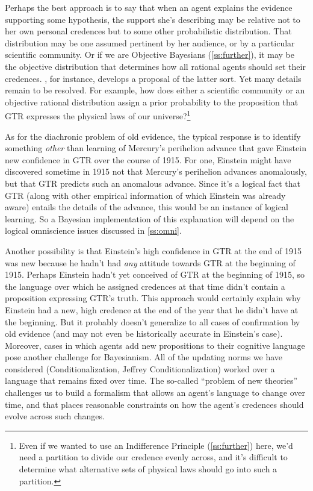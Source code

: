 Perhaps the best approach is to say that when an agent explains the evidence supporting some hypothesis, the support she's describing may be relative not to her own personal credences but to some other probabilistic distribution. That distribution may be one assumed pertinent by her audience, or by a particular scientific community. Or if we are Objective Bayesians (\autoref{ss:further}), it may be the objective distribution that determines how all rational agents should set their credences. \citet{MaherSubjectiveObjective}, for instance, develops a proposal of the latter sort. Yet many details remain to be resolved. For example, how does either a scientific community or an objective rational distribution assign a prior probability to the proposition that GTR expresses the physical laws of our universe?\footnote
{Even if we wanted to use an Indifference Principle (\autoref{ss:further}) here, we'd need a partition to divide our credence evenly across, and it's difficult to determine what alternative sets of physical laws should go into such a partition.} 

As for the diachronic problem of old evidence, the typical response is to identify something \emph{other} than learning of Mercury's perihelion advance that gave Einstein new confidence in GTR over the course of 1915. For one, Einstein might have discovered sometime in 1915 not that Mercury's perihelion advances anomalously, but that GTR predicts such an anomalous advance. Since it's a logical fact that GTR (along with other empirical information of which Einstein was already aware) entails the details of the advance, this would be an instance of logical learning. So a Bayesian implementation of this explanation will depend on the logical omniscience issues discussed in \autoref{ss:omni}.  

Another possibility is that Einstein's high confidence in GTR at the end of 1915 was new because he hadn't had \emph{any} attitude towards GTR at the beginning of 1915. Perhaps Einstein hadn't yet conceived of GTR at the beginning of 1915, so the language over which he assigned credences at that time didn't contain a proposition expressing GTR's truth. This approach would certainly explain why Einstein had a new, high credence at the end of the year that he didn't have at the beginning. But it probably doesn't generalize to all cases of confirmation by old evidence (and may not even be historically accurate in Einstein's case). Moreover, cases in which agents add new propositions to their cognitive language pose another challenge for Bayesianism. All of the updating norms we have considered (Conditionalization, Jeffrey Conditionalization) worked over a language that remains fixed over time. The so-called ``problem of new theories'' challenges us to build a formalism that allows an agent's language to change over time, and that places reasonable constraints on how the agent's credences should evolve across such changes.

